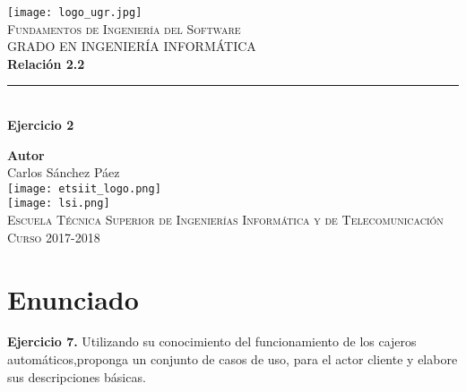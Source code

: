 \documentclass[12pt,spanish]{article}
\begin{document}
\begin{titlepage}

\newlength{\centeroffset}
\setlength{\centeroffset}{-0.5\oddsidemargin}
\addtolength{\centeroffset}{0.5\evensidemargin}
\thispagestyle{empty}

\noindent\hspace*{\centeroffset}\begin{minipage}{\textwidth}

\centering
\texttt{[image: logo\_ugr.jpg]}\\[1.4cm]

\textsc{ \Large Fundamentos de Ingeniería del Software\\[0.2cm]}
\textsc{GRADO EN INGENIERÍA INFORMÁTICA}\\[1cm]

{\Huge\bfseries Relación 2.2\\
}
\noindent\rule[-1ex]{\textwidth}{3pt}\\[3.5ex]
{\large\bfseries Ejercicio 2}
\end{minipage}

\vspace{2.5cm}
\noindent\hspace*{\centeroffset}
\begin{minipage}{\textwidth}
\centering

\textbf{Autor}\\ {Carlos Sánchez Páez}\\[2.5ex]
\texttt{[image: etsiit\_logo.png]}\\[0.1cm]
\vspace{1.5cm}
\texttt{[image: lsi.png]}\\[0.1cm]
\vspace{1cm}
\textsc{Escuela Técnica Superior de Ingenierías Informática y de Telecomunicación}\\
\vspace{1cm}
\textsc{Curso 2017-2018}
\end{minipage}
\end{titlepage}
\tableofcontents
\thispagestyle{empty}
\listoftables
\newpage
\setcounter{page}{1}
\section{Enunciado}
{\large\textbf{Ejercicio 7.} Utilizando su conocimiento del funcionamiento de los cajeros automáticos,proponga un conjunto de casos de uso, para el actor cliente y elabore sus descripciones básicas.}
\end{document}
